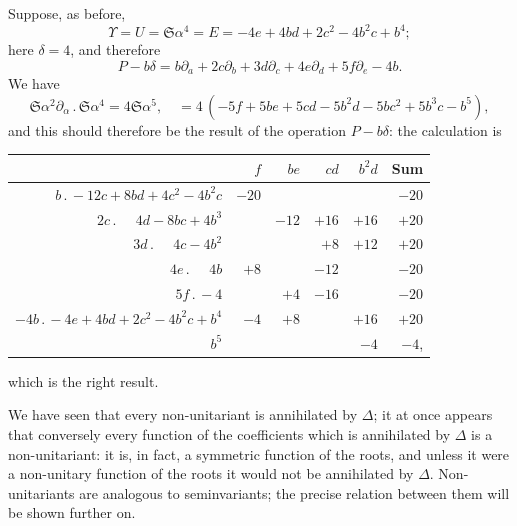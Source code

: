 \documentclass[11pt,a4paper]{book}
\begin{document}
\setcounter{art}{25}
\begin{art}
Suppose, as before,
\[
\Upsilon = U = \mathfrak{S}\alpha^{4} = E = -4e + 4bd + 2c^{2} - 4b^{2}c + b^{4};
\]
here $\delta = 4$, and therefore
\[
P - b\delta = b\partial_{a} + 2c\partial_{b} + 3d\partial_{c} + 4e\partial_{d} + 5f\partial_{e} - 4b.
\]
We have
\[
\mathfrak{S}\alpha^{2}\partial_{\alpha}\,.\,\mathfrak{S}\alpha^{4} = 4\mathfrak{S}\alpha^{5},\quad = 4\,(-5f + 5be + 5cd - 5b^{2}d - 5bc^{2} + 5b^{3}c - b^{5}),
\]
and this should therefore be the result of the operation $P - b\delta$: the calculation is
\begin{center}
\begin{tabular}{r|rrrr|r}
 & $f$ & $be$ & $cd$ & $b^{2}d$ & Sum \\
\hline
$b\,.\,-12c + 8bd + 4c^{2} - 4b^{2}c$ & $-20$ & & & & $-20$ \\
$2c\,.\,\phantom{+}4d - 8bc + 4b^{3}$ & & $-12$ & $+16$ & $+16$ & $+20$ \\
$3d\,.\,\phantom{+}4c - 4b^{2}$ & & & $+8$ & $+12$ & $+20$ \\
$4e\,.\,\phantom{+}4b$ & $+8$ & & $-12$ & & $-20$ \\
$5f\,.\,-4$ & & $+4$ & $-16$ & & $-20$ \\
$-4b\,.\,-4e + 4bd + 2c^{2} - 4b^{2}c + b^{4}$ & $-4$ & $+8$ & & $+16$ & $+20$ \\
$b^{5}$ & & & & $-4$ & $-4$,
\end{tabular}
\end{center}
which is the right result.

We have seen that every non-unitariant is annihilated by $\Delta$; it at once appears that conversely every function of the coefficients which is annihilated by $\Delta$ is a non-unitariant: it is, in fact, a symmetric function of the roots, and unless it were a non-unitary function of the roots it would not be annihilated by $\Delta$. Non-unitariants are analogous to seminvariants; the precise relation between them will be shown further on.
\end{art}
\end{document}
